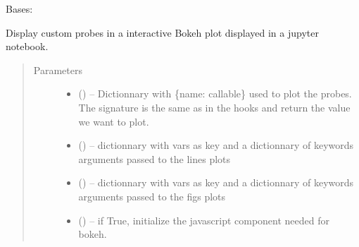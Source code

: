 \documentclass[letterpaper,10pt,english]{sphinxmanual}
\begin{document}
\begin{fulllineitems}
\label{\detokenize{triflow.plugins:triflow.plugins.displays.bokeh_probes_update}}
Bases: 

Display custom probes in a interactive Bokeh plot displayed in a jupyter notebook.
\begin{quote}\begin{description}
\item[{Parameters}] \leavevmode\begin{itemize}
\item {} 
 () -- Dictionnary with \{name: callable\} used to plot the probes. The signature is the same as in the hooks and return the value we want to plot.

\item {} 
 () -- dictionnary with vars as key and a dictionnary of keywords arguments passed to the lines plots

\item {} 
 () -- dictionnary with vars as key and a dictionnary of keywords arguments passed to the figs plots

\item {} 
 (\sphinxstyleliteralemphasis{, }) -- if True, initialize the javascript component needed for bokeh.

\end{itemize}

\end{description}\end{quote}

\end{fulllineitems}
\end{document}
